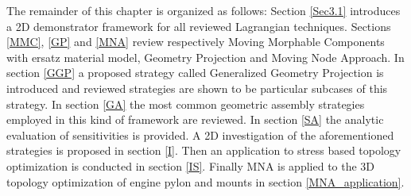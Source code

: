The remainder of this chapter is organized as follows:
Section \ref{Sec3.1} introduces a 2D demonstrator framework for all reviewed Lagrangian techniques. Sections \ref{MMC}, \ref{GP} and \ref{MNA} review respectively Moving Morphable Components with ersatz material model, Geometry Projection and Moving Node Approach. In section \ref{GGP} a proposed strategy called Generalized Geometry Projection is introduced and reviewed strategies are shown to be particular subcases of this strategy. In section \ref{GA} the most common geometric assembly strategies employed in this kind of framework are reviewed. In section \ref{SA} the analytic evaluation of sensitivities is provided. A 2D investigation of the aforementioned strategies is proposed in section \ref{I}. Then an application to stress based topology optimization is conducted in section \ref{IS}. Finally MNA is applied to the 3D topology optimization of engine pylon and mounts in section \ref{MNA_application}.


